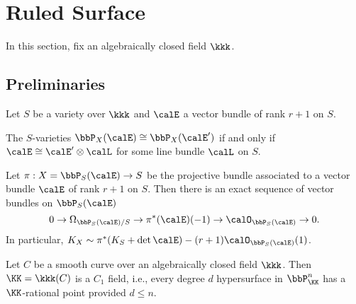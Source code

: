\section{Ruled Surface}

In this section, fix an algebraically closed field $\kkk$.

\subsection{Preliminaries}

    Let \(S\) be a variety over \(\kkk\) and \(\calE\) a vector bundle of rank \(r+1\) on \(S\).

    \begin{proposition}\label{prop:isomorphic_projective_bundle_iff_twist_by_line_bundle}
        The \(S\)-varieties \(\bbP_X(\calE) \cong \bbP_X(\calE')\) if and only if \(\calE \cong \calE' \otimes \calL\) for some line bundle \(\calL\) on \(S\).
    \end{proposition}

    \begin{theorem}\label{thm:Eulur_sequence_for_projective_bundle}
        Let \(\pi: X=\bbP_S(\calE) \to S\) be the projective bundle associated to a vector bundle \(\calE\) of rank \(r+1\) on \(S\). 
        Then there is an exact sequence of vector bundles on \(\bbP_S(\calE)\)
        \[
            0 \to \Omega_{\bbP_S(\calE)/S} \to \pi^*(\calE)(-1) \to \calO_{\bbP_S(\calE)} \to 0.
        \]
        In particular, \(K_X \sim \pi^*(K_S + \det \calE) - (r+1)\calO_{\bbP_S(\calE)}(1)\).
    \end{theorem}

    \begin{theorem}\label{thm:Tsen_theorem}
        Let \(C\) be a smooth curve over an algebraically closed field \(\kkk\). 
        Then \(\KK=\kkk(C)\) is a \(C_1\) field, i.e., every degree \(d\) hypersurface in \(\bbP^n_{\KK}\) has a \(\KK\)-rational point provided \(d \leq n\).
    \end{theorem}

